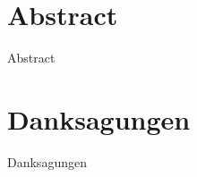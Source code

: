 \documentclass[twoside,12pt,a4paper]{report}
\begin{document}
\section*{Abstract}

Abstract
\newpage

\section*{Danksagungen}

Danksagungen

\cleardoublepage


\renewcommand{\baselinestretch}{1.3}
\small\normalsize

\tableofcontents

\renewcommand{\baselinestretch}{1}
\small\normalsize

\cleardoublepage


\setcounter{page}{1}


\cleardoublepage


\cleardoublepage


\cleardoublepage


\cleardoublepage






\end{document}
